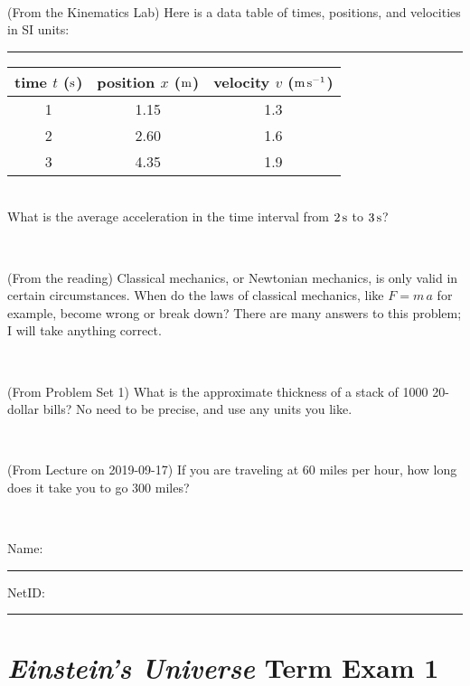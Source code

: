 \documentclass[12pt, letterpaper]{article}
\begin{document}
\vfill ~


\clearpage


\begin{problem} (From the Kinematics Lab)
Here is a data table of times, positions, and velocities in SI units:\\
\rule{1.0in}{0pt}\begin{tabular}{c|c|c}
time $t$ ($\mathrm{s}$) & position $x$ ($\mathrm{m}$) & velocity $v$ ($\mathrm{m}\,\mathrm{s}^{-1}$) \\
\hline
1 & 1.15 & 1.3 \\
2 & 2.60 & 1.6 \\
3 & 4.35 & 1.9 \\
\hline
\end{tabular}\\
What is the average acceleration in the time interval from $2\,\mathrm{s}$ to $3\,\mathrm{s}$?
\end{problem}


\vfill ~

\begin{problem} (From the reading)
Classical mechanics, or Newtonian mechanics, is only valid in certain
circumstances. When do the laws of classical mechanics, like $F =
m\,a$ for example, become wrong or break down? There are many answers
to this problem; I will take anything correct.
\end{problem}


\vfill ~

\begin{problem} (From Problem Set 1)
What is the approximate thickness of a stack of 1000 20-dollar bills?
No need to be precise, and use any units you like.
\end{problem}


\vfill ~

\begin{problem} (From Lecture on 2019-09-17)
If you are traveling at 60 miles per hour, how long does
it take you to go 300 miles?
\end{problem}


\vfill ~


\cleardoublepage



\noindent
Name: \rule[-1ex]{0.60\textwidth}{0.1pt}
NetID: \rule[-1ex]{0.20\textwidth}{0.1pt}

\section*{\textsl{Einstein's Universe} Term Exam 1}
\setcounter{problem}{1}
\end{document}

